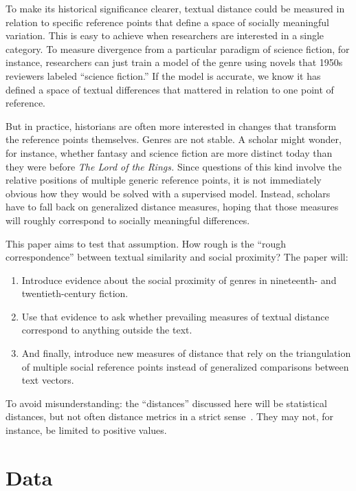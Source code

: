 \documentclass[11pt]{article}
\begin{document}
To make its historical significance clearer, textual distance could be measured in relation to specific reference points that define a space of socially meaningful variation. This is easy to achieve when researchers are interested in a single category. To measure divergence from a particular paradigm of science fiction, for instance, researchers can just train a model of the genre using novels that 1950s reviewers labeled ``science fiction.'' If the model is accurate, we know it has defined a space of textual differences that mattered in relation to one point of reference.

But in practice, historians are often more interested in changes that transform the reference points themselves. Genres are not stable. A scholar might wonder, for instance, whether fantasy and science fiction are more distinct today than they were before \textit{The Lord of the Rings.} Since questions of this kind involve the relative positions of multiple generic reference points, it is not immediately obvious how they would be solved with a supervised model. Instead, scholars have to fall back on generalized distance measures, hoping that those measures will roughly correspond to socially meaningful differences.

This paper aims to test that assumption. How rough is the ``rough correspondence'' between textual similarity and social proximity? The paper will:

\begin{enumerate}

\item Introduce evidence about the social proximity of genres in nineteenth- and twentieth-century fiction.
\item Use that evidence to ask whether prevailing measures of textual distance correspond to anything outside the text.
\item And finally, introduce new measures of distance that rely on the triangulation of multiple social reference points instead of generalized comparisons between text vectors.

\end{enumerate}

To avoid misunderstanding: the ``distances'' discussed here will be statistical distances, but not often distance metrics in a strict sense~\cite{cha2007comprehensive}. They may not, for instance, be limited to positive values.

\section{Data}
\label{data}
\end{document}
